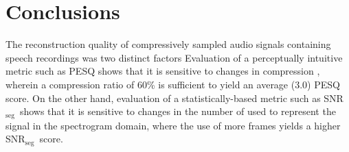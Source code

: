 \documentclass[10pt,a4paper,twoside]{article}
\newcommand{\snrseg}{SNR$_{\mathrm{seg}}$}
\begin{document}
\section{Conclusions}
The reconstruction quality of compressively sampled audio signals containing speech recordings was  two distinct factors Evaluation of a perceptually intuitive metric such as PESQ shows that it is sensitive to changes in compression , wherein a compression ratio of 60\% is sufficient to yield an average (3.0) PESQ score. On the other hand, evaluation of a statistically-based metric such as \snrseg~shows that it is sensitive to changes in the number of  used to represent the signal in the spectrogram domain, where the use of more frames yields a higher \snrseg~score.




\end{document}
